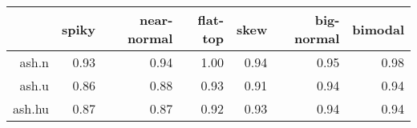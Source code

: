 \begin{tabular}{rrrrrrr}
  \toprule  & spiky & near-normal & flat-top & skew & big-normal & bimodal \\ 
  \midrule ash.n & 0.93 & 0.94 & 1.00 & 0.94 & 0.95 & 0.98 \\ 
  ash.u & 0.86 & 0.88 & 0.93 & 0.91 & 0.94 & 0.94 \\ 
  ash.hu & 0.87 & 0.87 & 0.92 & 0.93 & 0.94 & 0.94 \\ 
   \bottomrule \end{tabular}

